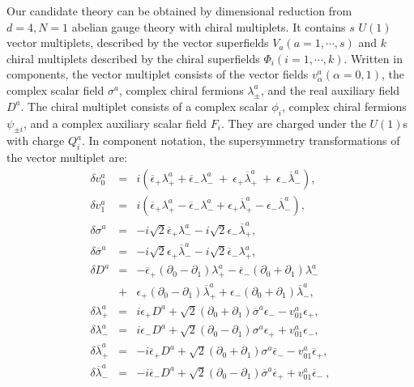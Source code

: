 \documentclass[a4paper,12pt]{article}
\begin{document}
Our candidate theory can be obtained by dimensional reduction from
$d=4,N=1$ abelian gauge theory with chiral multiplets.  It contains $s$
$U(1)$ vector multiplets, described by the vector superfields $V_a
(a=1,\cdots, s)$ and $k$ chiral multiplets described by the chiral
superfields $\Phi_i (i= 1,\cdots,k)$. Written in components, the vector
multiplet consists of the vector fields $v^a_{\alpha} (\alpha=0,1)$, the
complex scalar field $\sigma^a$, complex chiral fermions
$\lambda_{\pm}^a$, and the real auxiliary field $D^a$.  The chiral
multiplet consists of a complex scalar $\phi_i$, complex chiral fermions
$\psi_{\pm i}$, and a complex auxiliary scalar field $F_i$. They are
charged under the $U(1)$s with charge $Q_i^a$. In component notation, the
supersymmetry transformations of the vector multiplet are: 
\begin{eqnarray}
\delta v_0^a&=&i \left(\overline{\epsilon}_+ \lambda_+^a 
+\overline{\epsilon}_-\lambda_-^a ~+~\epsilon_+\overline{\lambda}_+^a
~+~\epsilon_-\overline{\lambda}_-^a \right), \nonumber \\
\delta v_1^a&=& i\left( \overline{\epsilon}_+ \lambda_+^a -  
\overline{\epsilon}_- \lambda_-^a+\epsilon_+ \overline{\lambda}_+^a
-\epsilon_- \overline{\lambda}_-^a \right), \nonumber \\
\delta \sigma^a&=&-i \sqrt{2} \overline{\epsilon}_+
\lambda_-^a -i\sqrt{2}\epsilon_-\overline{\lambda}_+^a,\nonumber \\
\delta \overline{\sigma}^a&=&-i \sqrt{2}\epsilon_+\overline{\lambda}_-^a -i
\sqrt{2}\overline{\epsilon}_-\lambda_+^a, \nonumber \\
\delta D^a&=&- \overline{\epsilon}_+(\partial_0 - \partial_1)\lambda_+^a
-\overline
{\epsilon}_-(\partial_0 + \partial_1)\lambda_-^a \\ 
&+&\epsilon_+(\partial_0 -
\partial_1) \overline{\lambda}_+^a +\epsilon_-(\partial_0 + \partial_1)
\overline{\lambda}_-^a, \nonumber \\
\delta \lambda_+^a&=&i\epsilon_+D^a+\sqrt{2}
(\partial_0+\partial_1)\overline{\sigma}^a
\epsilon_- -v^a_{01} \epsilon_+, \nonumber \\
\delta \lambda_-^a&=&i \epsilon_-D^a+\sqrt{2}(\partial_0- \partial_1)\sigma^a
\epsilon_+ +v^a_{01}\epsilon_-, \nonumber \\
\delta \overline{\lambda}_+^a&=&-i \overline{\epsilon}_+D^a
+\sqrt{2}(\partial_0 + \partial_1) \sigma^a\overline{\epsilon}_- 
-v^a_{01}\overline{\epsilon}_+ \nonumber, \\
\delta \overline{\lambda}_-^a&=&-i \overline{\epsilon}_-D^a
+\sqrt{2}(\partial_0 - \partial_1)\overline{\sigma}^a \overline{\epsilon}_+ 
+v_{01}^a\overline{\epsilon}_- \ ,\nonumber
\label{vectortrans}
\end{eqnarray}
\end{document}
